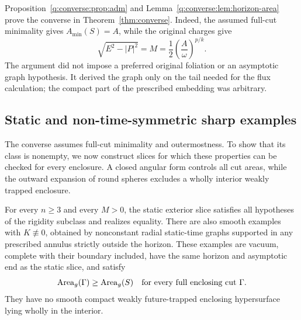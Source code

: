 Proposition~\ref{q:converse:prop:adm} and
Lemma~\ref{q:converse:lem:horizon-area} prove the converse in
Theorem~\ref{thm:converse}.  Indeed, the assumed full-cut minimality
gives $A_{\min}(S)=A$, while the original charges give
\[
 \sqrt{E^2-|P|^2}=M
 =\frac12\left(\frac{A}{\omega}\right)^{p/k}.
\]
The argument did not impose a preferred original foliation or an
asymptotic graph hypothesis.  It derived the graph only on the tail
needed for the flux calculation; the compact part of the prescribed
embedding was arbitrary.

\subsection{Static and non-time-symmetric sharp examples}

The converse assumes full-cut minimality and outermostness.  To show
that its class is nonempty, we now construct slices for which these
properties can be checked for every enclosure.  A closed angular
form controls all cut areas, while the outward expansion of round
spheres excludes a wholly interior weakly trapped enclosure.

\begin{proposition}
\label{q:converse:prop:examples}
For every $n\ge3$ and every $M>0$, the static exterior slice satisfies
all hypotheses of the rigidity subclass and realizes equality.
There are also smooth examples with $K\not\equiv0$, obtained by
nonconstant radial static-time graphs supported in any prescribed
annulus strictly outside the horizon.  These examples are vacuum,
complete with their boundary included, have the same horizon and
asymptotic end as the static slice, and satisfy
\[
 \operatorname{Area}_g(\Gamma)\ge\operatorname{Area}_g(S)
 \quad\hbox{for every full enclosing cut }\Gamma.
\]
They have no smooth compact weakly future-trapped enclosing
hypersurface lying wholly in the interior.
\end{proposition}

